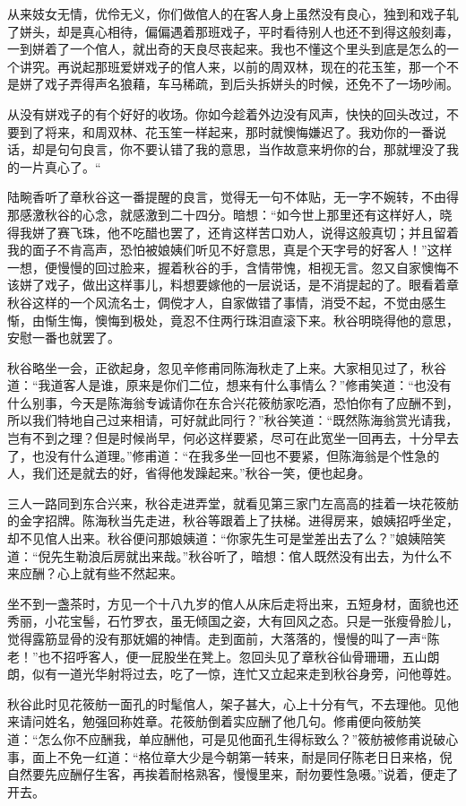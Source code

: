 \documentclass[12pt,UTF8]{ctexbook}
\begin{document}
{{{从来妓女无情，优伶无义，你们做倌人的在客人身上虽然没有良心，独到和戏子轧了姘头，却是真心相待，偏偏遇着那班戏子，平时看待别人也还不到得这般刻毒，一到姘着了一个倌人，就出奇的天良尽丧起来。我也不懂这个里头到底是怎么的一个讲究。再说起那班爱姘戏子的倌人来，以前的周双林，现在的花玉笙，那一个不是姘了戏子弄得声名狼藉，车马稀疏，到后头拆姘头的时候，还免不了一场吵闹。

从没有姘戏子的有个好好的收场。你如今趁着外边没有风声，快快的回头改过，不要到了将来，和周双林、花玉笙一样起来，那时就懊悔嫌迟了。我劝你的一番说话，却是句句良言，你不要认错了我的意思，当作故意来坍你的台，那就埋没了我的一片真心了。“

陆畹香听了章秋谷这一番提醒的良言，觉得无一句不体贴，无一字不婉转，不由得那感激秋谷的心念，就感激到二十四分。暗想：“如今世上那里还有这样好人，晓得我姘了赛飞珠，他不吃醋也罢了，还肯这样苦口劝人，说得这般真切；并且留着我的面子不肯高声，恐怕被娘姨们听见不好意思，真是个天字号的好客人！”这样一想，便慢慢的回过脸来，握着秋谷的手，含情带愧，相视无言。忽又自家懊悔不该姘了戏子，做出这样事儿，料想要嫁他的一层说话，是不消提起的了。眼看着章秋谷这样的一个风流名士，倜傥才人，自家做错了事情，消受不起，不觉由感生惭，由惭生悔，懊悔到极处，竟忍不住两行珠泪直滚下来。秋谷明晓得他的意思，安慰一番也就罢了。

秋谷略坐一会，正欲起身，忽见辛修甫同陈海秋走了上来。大家相见过了，秋谷道：“我道客人是谁，原来是你们二位，想来有什么事情么？”修甫笑道：“也没有什么别事，今天是陈海翁专诚请你在东合兴花筱舫家吃酒，恐怕你有了应酬不到，所以我们特地自己过来相请，可好就此同行？”秋谷笑道：“既然陈海翁赏光请我，岂有不到之理？但是时候尚早，何必这样要紧，尽可在此宽坐一回再去，十分早去了，也没有什么道理。”修甫道：“在我多坐一回也不要紧，但陈海翁是个性急的人，我们还是就去的好，省得他发躁起来。”秋谷一笑，便也起身。

三人一路同到东合兴来，秋谷走进弄堂，就看见第三家门左高高的挂着一块花筱舫的金字招牌。陈海秋当先走进，秋谷等跟着上了扶梯。进得房来，娘姨招呼坐定，却不见倌人出来。秋谷便问那娘姨道：“你家先生可是堂差出去了么？”娘姨陪笑道：“倪先生勒浪后房就出来哉。”秋谷听了，暗想：倌人既然没有出去，为什么不来应酬？心上就有些不然起来。

坐不到一盏茶时，方见一个十八九岁的倌人从床后走将出来，五短身材，面貌也还秀丽，小花宝髻，石竹罗衣，虽无倾国之姿，大有回风之态。只是一张瘦骨脸儿，觉得露筋显骨的没有那妩媚的神情。走到面前，大落落的，慢慢的叫了一声“陈老！”也不招呼客人，便一屁股坐在凳上。忽回头见了章秋谷仙骨珊珊，五山朗朗，似有一道光华射将过去，吃了一惊，连忙又立起来走到秋谷身旁，问他尊姓。

秋谷此时见花筱舫一面孔的时髦倌人，架子甚大，心上十分有气，不去理他。见他来请问姓名，勉强回称姓章。花筱舫倒着实应酬了他几句。修甫便向筱舫笑道：“怎么你不应酬我，单应酬他，可是见他面孔生得标致么？”筱舫被修甫说破心事，面上不免一红道：“格位章大少是今朝第一转来，耐是同仔陈老日日来格，倪自然要先应酬仔生客，再挨着耐格熟客，慢慢里来，耐勿要性急嗫。”说着，便走了开去。

}}}
\end{document}
